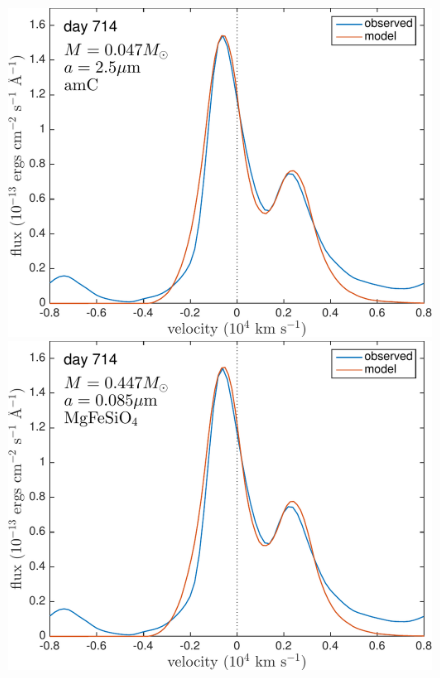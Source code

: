 \begin{landscape}
\begin{figure}
\includegraphics[trim =25 20 0 0,clip=true,scale=0.33]{chapters/chapter5/images/silicates_take2/OI/AmC_Dwek.pdf}
\includegraphics[trim =25 20 0 0,clip=true,scale=0.33]{chapters/chapter5/images/silicates_take2/OI/MgFeSiO4_Dwek.pdf}


\end{figure}
\end{landscape}

